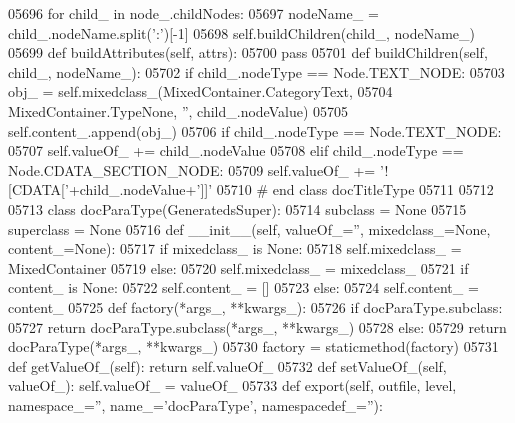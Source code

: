 \begin{DoxyCode}
{{{{{{{{{{{{{{{{{{{{{{{{{{{{{{{{{{{{{{{{{{{{{{{{{{{{{{{{{{{{{{{{{{{{{{{{{{{{{{{{{{{{{{{{{{{{{{{{{{{{{{{{{{{{{{{{{{{{{{{{{{{{{{{{{{{{{{{{{{{{{{{{{{{{{{{{{{{{{{{{{{{{{{{{{{{{{{{{{{{{{{{{{{{{{{{{{{{{{{{{{{{{{{{{{{{{{{{{{{{{{{{{{{{{{{{{{{{{{{{{{{{{{{{{{{{{{{{{{{{{{{{{{{{{{{{{{{{{{{{{{{{{{{{{{{{{{{{{{{{{{{{{{{{{{{{{{{{{{{{{{{{{{{{{{{{{{{{{{{{{{{{{{{{{{{{05696         \textcolor{keywordflow}{for} child\_ \textcolor{keywordflow}{in} node\_.childNodes:
05697             nodeName\_ = child\_.nodeName.split(\textcolor{stringliteral}{':'})[-1]
05698             self.buildChildren(child\_, nodeName\_)
05699     \textcolor{keyword}{def }buildAttributes(self, attrs):
05700         \textcolor{keywordflow}{pass}
05701     \textcolor{keyword}{def }buildChildren(self, child\_, nodeName\_):
05702         \textcolor{keywordflow}{if} child\_.nodeType == Node.TEXT\_NODE:
05703             obj\_ = self.mixedclass\_(MixedContainer.CategoryText,
05704                 MixedContainer.TypeNone, \textcolor{stringliteral}{''}, child\_.nodeValue)
05705             self.content\_.append(obj\_)
05706         \textcolor{keywordflow}{if} child\_.nodeType == Node.TEXT\_NODE:
05707             self.valueOf\_ += child\_.nodeValue
05708         \textcolor{keywordflow}{elif} child\_.nodeType == Node.CDATA\_SECTION\_NODE:
05709             self.valueOf\_ += \textcolor{stringliteral}{'![CDATA['}+child\_.nodeValue+\textcolor{stringliteral}{']]'}
05710 \textcolor{comment}{# end class docTitleType}
05711 
05712 
05713 \textcolor{keyword}{class }docParaType(GeneratedsSuper):
05714     subclass = \textcolor{keywordtype}{None}
05715     superclass = \textcolor{keywordtype}{None}
05716     \textcolor{keyword}{def }__init__(self, valueOf\_='', mixedclass\_=None, content\_=None):
05717         \textcolor{keywordflow}{if} mixedclass\_ \textcolor{keywordflow}{is} \textcolor{keywordtype}{None}:
05718             self.mixedclass_ = MixedContainer
05719         \textcolor{keywordflow}{else}:
05720             self.mixedclass_ = mixedclass\_
05721         \textcolor{keywordflow}{if} content\_ \textcolor{keywordflow}{is} \textcolor{keywordtype}{None}:
05722             self.content_ = []
05723         \textcolor{keywordflow}{else}:
05724             self.content_ = content\_
05725     \textcolor{keyword}{def }factory(*args\_, **kwargs\_):
05726         \textcolor{keywordflow}{if} docParaType.subclass:
05727             \textcolor{keywordflow}{return} docParaType.subclass(*args\_, **kwargs\_)
05728         \textcolor{keywordflow}{else}:
05729             \textcolor{keywordflow}{return} docParaType(*args\_, **kwargs\_)
05730     factory = staticmethod(factory)
05731     \textcolor{keyword}{def }getValueOf_(self): \textcolor{keywordflow}{return} self.valueOf\_
05732     \textcolor{keyword}{def }setValueOf_(self, valueOf\_): self.valueOf\_ = valueOf\_
05733     \textcolor{keyword}{def }export(self, outfile, level, namespace\_='', name\_='docParaType', namespacedef\_=''):
}}}}}}}}}}}}}}}}}}}}}}}}}}}}}}}}}}}}}}}}}}}}}}}}}}}}}}}}}}}}}}}}}}}}}}}}}}}}}}}}}}}}}}}}}}}}}}}}}}}}}}}}}}}}}}}}}}}}}}}}}}}}}}}}}}}}}}}}}}}}}}}}}}}}}}}}}}}}}}}}}}}}}}}}}}}}}}}}}}}}}}}}}}}}}}}}}}}}}}}}}}}}}}}}}}}}}}}}}}}}}}}}}}}}}}}}}}}}}}}}}}}}}}}}}}}}}}}}}}}}}}}}}}}}}}}}}}}}}}}}}}}}}}}}}}}}}}}}}}}}}}}}}}}}}}}}}}}}}}}}}}}}}}}}}}}}}}}}}}}}}}}}}}}}}}}
\end{DoxyCode}
